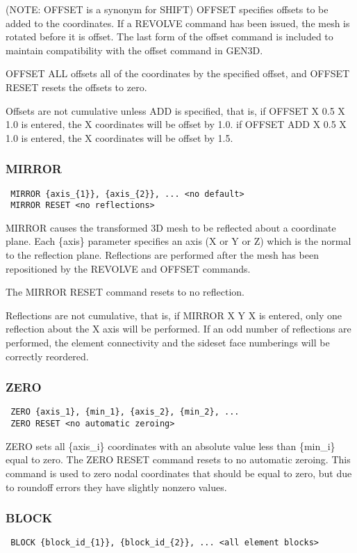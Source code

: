 (NOTE: OFFSET is a synonym for SHIFT)
OFFSET specifies offsets to be added to the coordinates.  If a REVOLVE
command has been issued, the mesh is rotated before it is offset.  The
last form of the offset command is included to maintain compatibility
with the offset command in GEN3D.

OFFSET ALL offsets all of the coordinates by the specified offset, and
OFFSET RESET resets the offsets to zero.

Offsets are not cumulative unless ADD is specified, that is,
if OFFSET X 0.5 X 1.0 is entered, the X coordinates will be offset by 1.0.
if OFFSET ADD X 0.5 X 1.0 is entered, the X coordinates will be offset by 1.5.
\subsubsection{MIRROR}
\begin{verbatim}
 MIRROR {axis_{1}}, {axis_{2}}, ... <no default>
 MIRROR RESET <no reflections>
\end{verbatim}

MIRROR causes the transformed 3D mesh to be reflected about a coordinate
plane.  Each \{axis\} parameter specifies an axis (X or Y or Z) which is
the normal to the reflection plane.  Reflections are performed after the
mesh has been repositioned by the REVOLVE and OFFSET commands.

The MIRROR RESET command resets to no reflection.

Reflections are not cumulative, that is, if MIRROR X Y X is entered,
only one reflection about the X axis will be performed.  If an odd
number of reflections are performed, the element connectivity and the
sideset face numberings will be correctly reordered.
\subsubsection{ZERO}
\begin{verbatim}
 ZERO {axis_1}, {min_1}, {axis_2}, {min_2}, ...
 ZERO RESET <no automatic zeroing>
\end{verbatim}

ZERO sets all \{axis\_i\} coordinates with an absolute value less than
\{min\_i\} equal to zero.  The ZERO RESET command resets to no automatic
zeroing.  This command is used to zero nodal coordinates that should be
equal to zero, but due to roundoff errors they have slightly nonzero
values.
\subsubsection{BLOCK}
\begin{verbatim}
 BLOCK {block_id_{1}}, {block_id_{2}}, ... <all element blocks>
\end{verbatim}

